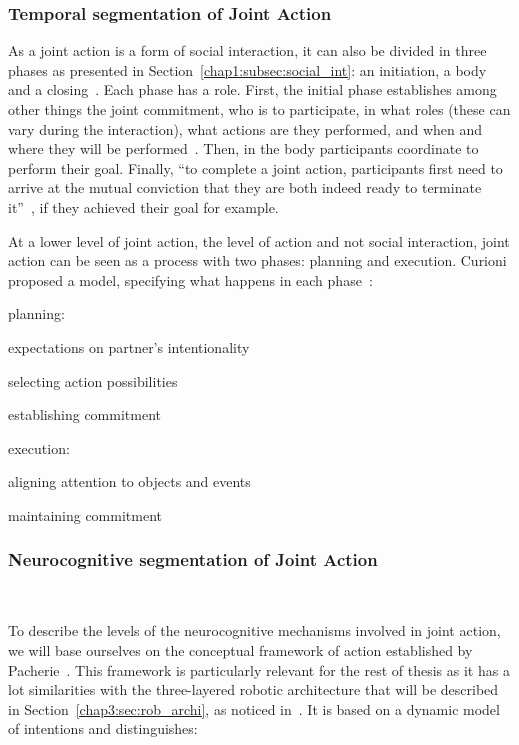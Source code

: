 \documentclass[a4paper,11pt,twoside]{StyleThese}
\begin{document}
\subsubsection{Temporal segmentation of Joint Action}
As a joint action is a form of social interaction, it can also be divided in three phases as presented in Section~\ref{chap1:subsec:social_int}: an initiation, a body and a closing~\cite{heesen_2017_social}. Each phase has a role. First, the initial phase establishes among other things the joint commitment, \ie who is to participate, in what roles (these can vary during the interaction), what actions are they performed, and when and where they will be performed~\cite{clark_2006_social}. Then, in the body participants coordinate to perform their goal. Finally, ``to complete a joint action, participants first need to arrive at the mutual conviction that they are both indeed ready to terminate it''~\cite{heesen_2017_social}, if they achieved their goal for example.

At a lower level of joint action, the level of action and not social interaction, joint action can be seen as a process with two phases: planning and execution. Curioni \etal{} proposed a model, specifying what happens in each phase~\cite{curioni_2017_joint}: 
\begin{bulletList}
	\item planning: 
	\begin{bulletList}
		\item expectations on partner's intentionality
		\item selecting action possibilities
		\item establishing commitment
	\end{bulletList}
	\item execution:
	\begin{bulletList}
		\item aligning attention to objects and events
		\item maintaining commitment
	\end{bulletList}
\end{bulletList}
\subsubsection{Neurocognitive segmentation of Joint Action}~\label{chap1:subsubsec:neuro_seg}

To describe the levels of the neurocognitive mechanisms involved in joint action, we will base ourselves on the conceptual framework of action established by Pacherie~\cite{pacherie_2008_phenomenology}. This framework is particularly relevant for the rest of thesis as it has a lot similarities with the three-layered robotic architecture that will be described in Section~\ref{chap3:sec:rob_archi}, as noticed in~\cite{clodic_2017_key}. It is based on a dynamic model of intentions and distinguishes:
\end{document}
